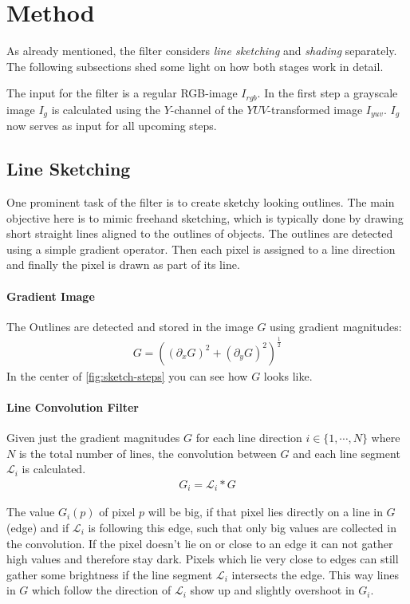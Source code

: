 \section{Method} \label{method}
As already mentioned, the filter considers \textit{line sketching} and
\textit{shading} separately.
The following subsections shed some light on how both stages work in detail.

The input for the filter is a regular RGB-image $I_{rgb}$. In the first step a
grayscale image $I_g$ is calculated using the $Y$-channel of the
$YUV$-transformed image $I_{yuv}$. $I_g$ now serves as input for all upcoming
steps.

\subsection{Line Sketching}
One prominent task of the filter is to create sketchy looking outlines. The main
objective here is to mimic freehand sketching, which is typically done by
drawing short straight lines aligned to the outlines of objects. The outlines
are detected using a simple gradient operator. Then each pixel is assigned to a
line direction and finally the pixel is drawn as part of its line.

\paragraph{Gradient Image}
The Outlines are detected and stored in the image $G$ using gradient magnitudes:
\begin{align*}
  G = ((\partial_x G)^2 + (\partial_y G)^2)^{\frac{1}{2}}
\end{align*}
In the center of \autoref{fig:sketch-steps} you can see how $G$ looks like.

\paragraph{Line Convolution Filter}
Given just the gradient magnitudes $G$ for each line direction $i \in
\lbrace 1,\cdots,N\rbrace$ where $N$ is the total number of lines, the convolution between
$G$ and each line segment $\mathscr{L}_i$ is calculated.
\begin{align}
  G_i = \mathscr{L}_i * G
  \label{eq:Gi}
\end{align}

The value $G_i(p)$ of pixel $p$ will be big, if that pixel lies directly on
a line in $G$ (edge) and if $\mathscr{L}_i$ is following this edge, such that only big
values are collected in the convolution. If the pixel doesn't lie on or close to
an edge it can not gather high values and therefore stay dark. Pixels which lie
very close to edges can still gather some brightness if the
line segment $\mathscr{L}_i$ intersects the edge. This way lines in $G$ which
follow the direction of $\mathscr{L}_i$ show up and slightly overshoot in $G_i$.

